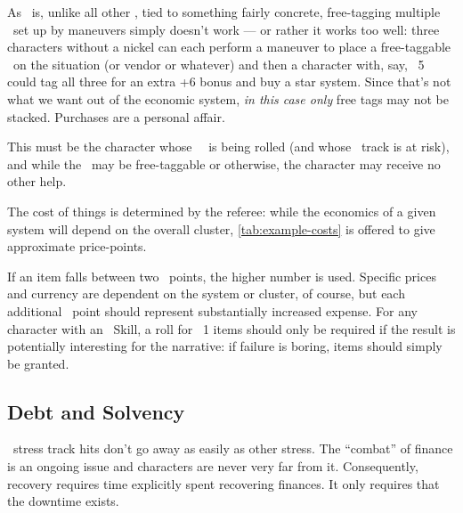 As \Assets\ is, unlike all other \Skills, tied to something fairly concrete, free-tagging multiple \Aspects\ set up by maneuvers simply doesn't work --- or rather it works too well: three characters without a nickel can each perform a maneuver to place a free-taggable \Aspect\ on the situation (or vendor or whatever) and then a character with, say, \Assets\ 5 could tag all three for an extra +6 bonus and buy a star system. Since that's not what we want out of the economic system, \emph{in this case only} free tags may not be stacked. Purchases are a personal affair.

\newpage


 This must be the character whose \Assets\ \Skill\ is being rolled (and whose \Wealth\ track is at risk), and while the \Aspect\ may be free-taggable or otherwise, the character may receive no other help.

The cost of things is determined by the referee: while the economics of a given system will depend on the overall cluster, \autoref{tab:example-costs} is offered to give approximate price-points.

If an item falls between two \Cost\ points, the higher number is used. Specific prices and currency are dependent on the system or cluster, of course, but each additional \Cost\ point should represent substantially increased expense. For any character with an \Assets\ Skill, a roll for \Cost\ 1 items should only be required if the result is potentially interesting for the narrative: if failure is boring, items should simply be granted.


\subsection{Debt and Solvency}
\label{sec:debt-and-solvency}

\Wealth\ stress track hits don't go away as easily as other stress. The ``combat'' of finance is an ongoing issue and characters are never very far from it. Consequently, recovery requires time explicitly spent recovering finances. It only requires that the downtime exists.

